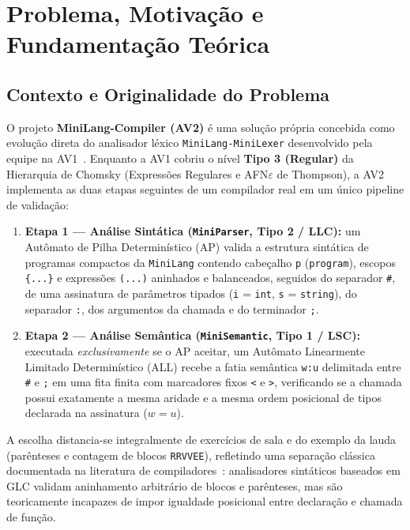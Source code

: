 \section{Problema, Motivação e Fundamentação Teórica}

\subsection{Contexto e Originalidade do Problema}

O projeto \textbf{MiniLang-Compiler (AV2)} é uma solução própria concebida como evolução direta do analisador léxico \texttt{MiniLang-MiniLexer} desenvolvido pela equipe na AV1~\cite{av1}. Enquanto a AV1 cobriu o nível \textbf{Tipo 3 (Regular)} da Hierarquia de Chomsky (Expressões Regulares e AFN$\varepsilon$ de Thompson), a AV2 implementa as duas etapas seguintes de um compilador real em um único pipeline de validação:

\begin{enumerate}
    \item \textbf{Etapa 1 --- Análise Sintática (\texttt{MiniParser}, Tipo 2 / LLC):} um Autômato de Pilha Determinístico (AP) valida a estrutura sintática de programas compactos da \texttt{MiniLang} contendo cabeçalho \texttt{p} (\texttt{program}), escopos \texttt{\{...\}} e expressões \texttt{(...)} aninhados e balanceados, seguidos do separador \texttt{\#}, de uma assinatura de parâmetros tipados (\texttt{i} = \texttt{int}, \texttt{s} = \texttt{string}), do separador \texttt{:}, dos argumentos da chamada e do terminador \texttt{;}.
    \item \textbf{Etapa 2 --- Análise Semântica (\texttt{MiniSemantic}, Tipo 1 / LSC):} executada \emph{exclusivamente} se o AP aceitar, um Autômato Linearmente Limitado Determinístico (ALL) recebe a fatia semântica \texttt{w:u} delimitada entre \texttt{\#} e \texttt{;} em uma fita finita com marcadores fixos \texttt{<} e \texttt{>}, verificando se a chamada possui exatamente a mesma aridade e a mesma ordem posicional de tipos declarada na assinatura ($w = u$).
\end{enumerate}

A escolha distancia-se integralmente de exercícios de sala e do exemplo da lauda~\cite{atividade} (parênteses e contagem de blocos \texttt{RRVVEE}), refletindo uma separação clássica documentada na literatura de compiladores~\cite{aho}: analisadores sintáticos baseados em GLC validam aninhamento arbitrário de blocos e parênteses, mas são teoricamente incapazes de impor igualdade posicional entre declaração e chamada de função.

